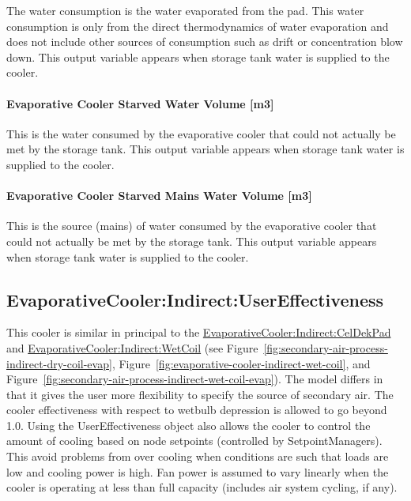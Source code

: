 The water consumption is the water evaporated from the pad. This water consumption is only from the direct thermodynamics of water evaporation and does not include other sources of consumption such as drift or concentration blow down. This output variable appears when storage tank water is supplied to the cooler.

\paragraph{Evaporative Cooler Starved Water Volume {[}m3{]}}\label{evaporative-cooler-starved-water-volume-m3-3}

This is the water consumed by the evaporative cooler that could not actually be met by the storage tank. This output variable appears when storage tank water is supplied to the cooler.

\paragraph{Evaporative Cooler Starved Mains Water Volume {[}m3{]}}\label{evaporative-cooler-starved-mains-water-volume-m3-3}

This is the source (mains) of water consumed by the evaporative cooler that could not actually be met by the storage tank. This output variable appears when storage tank water is supplied to the cooler.

\subsection{EvaporativeCooler:Indirect:UserEffectiveness}\label{evaporativecoolerindirectusereffectiveness}

This cooler is similar in principal to the \hyperref[evaporativecoolerindirectceldekpad]{EvaporativeCooler:Indirect:CelDekPad} and \hyperref[evaporativecoolerindirectwetcoil]{EvaporativeCooler:Indirect:WetCoil} (see Figure~\ref{fig:secondary-air-process-indirect-dry-coil-evap}, Figure~\ref{fig:evaporative-cooler-indirect-wet-coil}, and Figure~\ref{fig:secondary-air-process-indirect-wet-coil-evap}). The model differs in that it gives the user more flexibility to specify the source of secondary air. The cooler effectiveness with respect to wetbulb depression is allowed to go beyond 1.0. Using the UserEffectiveness object also allows the cooler to control the amount of cooling based on node setpoints (controlled by SetpointManagers). This avoid problems from over cooling when conditions are such that loads are low and cooling power is high. Fan power is assumed to vary linearly when the cooler is operating at less than full capacity (includes air system cycling, if any).

